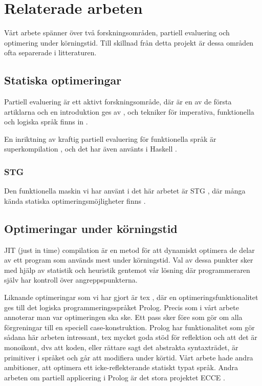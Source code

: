 \documentclass[Rapport]{subfiles}
\begin{document}
\section{Relaterade arbeten}

Vårt arbete spänner över två forskningsområden, partiell evaluering
och optimering under körningstid. Till skillnad från detta projekt 
är dessa områden ofta separerade i litteraturen.

\subsection{Statiska optimeringar}

Partiell evaluering är ett aktivt forskningsområde, där 
\cite{futamura} är en av de första artiklarna
och en introduktion ges av \cite{intropap}, och
tekniker för imperativa, funktionella och logiska språk
finns in \cite{jones1993partial}.

En inriktning av kraftig partiell evaluering för 
funktionella språk är superkompilation \cite{srensen1995algorithm}
, och det har även använts i Haskell \cite{mitchell2007supercompiler}.


\subsubsection{STG}

Den funktionella maskin vi har använt i det här arbetet är 
STG \cite{stg}, där många kända statiska optimeringsmöjligheter 
finns \cite{santos}.

\subsection{Optimeringar under körningstid}

JIT (just in time) compilation är en metod för att dynamiskt optimera
de delar av ett program som används mest under körningstid. Val av
dessa punkter sker med hjälp av statistik och heuristik gentemot vår
lösning där programmeraren själv har kontroll över angreppspunkterna. 


Liknande optimeringar som vi har gjort är tex \cite{bolz-automatic},
där en optimeringsfunktionalitet ges till det logiska programmeringsspråket
Prolog. Precis som i vårt arbete annoterar man var optimeringen ska ske.
Ett pass sker före som gör om alla förgreningar till en speciell 
case-konstruktion. Prolog har funktionalitet som gör sådana här arbeten
intressant, tex mycket goda stöd för reflektion och att det är 
monoikont, dvs att koden, eller rättare sagt det abstrakta syntaxträdet,
är primitiver i språket och går att modifiera under körtid. Vårt arbete
hade andra ambitioner, att optimera ett icke-reflekterande statiskt typat
språk. Andra arbeten om partiell applicering i Prolog är det stora
projektet ECCE \cite{ecce}.
\end{document}
